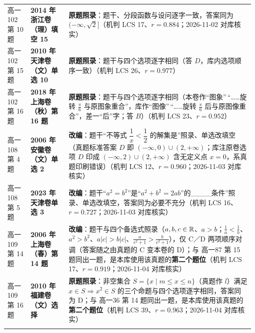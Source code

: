 \documentclass[a4paper,11pt]{article}
\begin{document}
\begin{xltabular}{\textwidth}{@{}>{\raggedright\arraybackslash}p{2.85cm}>{\raggedright\arraybackslash}p{3.99cm}>{\raggedright\arraybackslash}p{7.89cm}@{}}
高一102 第 10 题 & \textbf{2014 年浙江卷（理）填空 15} & \textbf{原题照录}：题干、分段函数与设问逐字一致，答案同为 \((-\infty,\allowbreak \sqrt2]\)（机判 LCS 17、\(r=\allowbreak 0.884\)；2026-11-02 对库核实） \\ \addlinespace[1pt]
高一102 第 15 题 & \textbf{2010 年天津卷（文）单选 10} & \textbf{原题照录}：题干与四个选项逐字相同（答 \(D\)，库内选项顺序一致）（机判 LCS 26、\(r=\allowbreak 0.977\)） \\ \addlinespace[1pt]
高一102 第 16 题 & \textbf{2018 年上海卷（秋）第 16 题} & \textbf{原题照录}：题干与四个选项逐字相同（本卷作``图象''\,``\ldots\ldots 旋转 \(\frac\pi6\) 与原图象重合''，库作``图像''\,``\ldots\ldots 旋转 \(\frac\pi6\) 后与原图像重合''，差一``后''字；答 \(B\)）（机判 LCS 23、\(r=\allowbreak 0.952\)） \\ \addlinespace[1pt]
高一108 第 4 题 & \textbf{2006 年安徽卷（文）单选 2} & \textbf{改编}：题干``不等式 \(\dfrac1x<\dfrac12\) 的解集是''照录、单选改填空（真题标准答案 \(D\) 即 \((-\infty,\allowbreak 0)\cup\allowbreak (2,\allowbreak +\allowbreak \infty)\)；库注原卷选项 \(D\) 印成 \((-\infty,\allowbreak 2)\cup\allowbreak (2,\allowbreak +\allowbreak \infty)\) 含无定义点 \(x=\allowbreak 0\)，系真题印刷错误）（机判 LCS 12、\(r=\allowbreak 0.960\)；2026-11-03 对库核实） \\ \addlinespace[1pt]
高一108 第 5 题 & \textbf{2023 年天津卷单选 3} & \textbf{改编}：题干``\(a^2=b^2\)''是``\(a^2+b^2=\allowbreak 2ab\)''的\_\_\_\_条件''照录、单选改填空，答案同为必要不充分（机判 LCS 16、\(r=\allowbreak 0.727\)；2026-11-03 对库核实） \\ \addlinespace[1pt]
高一109 第 14 题 & \textbf{2006 年上海卷（春）第 14 题} & \textbf{改编}：题干与四个备选式照录（\(a,b,c\in\mathbb{R}\)、\(a>b\)；\(\frac1a<\frac1b\)、\(a^2>b^2\)、\(a\lvert c\rvert>b\lvert c\rvert\)、\(\frac a{c^2+\allowbreak 1}>\frac b{c^2+\allowbreak 1}\)），仅 C／D 两项顺序对调（答案随之由真题的 C 变本卷的 D）；与 高一87 第 15 题同出一题，是本库使用该真题的\textbf{第二个题位}（机判 LCS 17、\(r=\allowbreak 0.919\)；2026-11-04 对库核实） \\ \addlinespace[1pt]
高一109 第 16 题 & \textbf{2010 年福建卷（文）选择} & \textbf{原题照录}：非空集合 \(S=\allowbreak \{x\mid\allowbreak  m\leqslant\allowbreak  x\leqslant\allowbreak  n\}\)（真题作 \(l\)）满足 \(x\in S\Rightarrow x^2\in S\) 的三个命题与四个选项逐字相同，答案同为 D；与 高一36 第 14 题同出一题，是本库使用该真题的\textbf{第二个题位}（机判 LCS 39、\(r=\allowbreak 0.963\)；2026-11-04 对库核实） \\ \addlinespace[1pt]

\end{xltabular}
\end{document}
